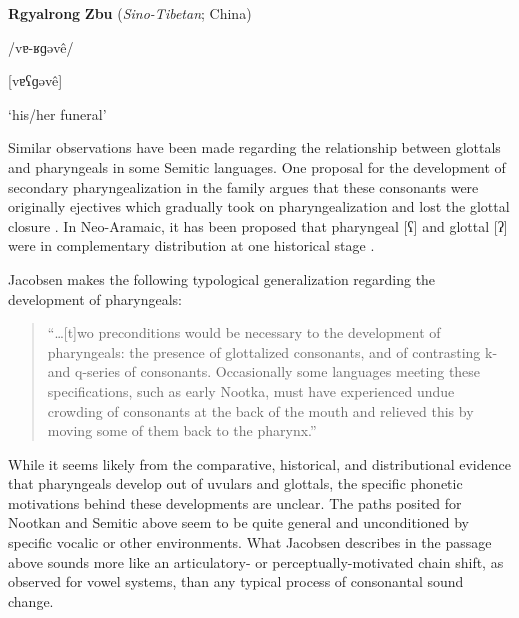 \ea\label{ex:(4.47)}
  \textbf{Rgyalrong} \textbf{Zbu} (\textit{Sino-Tibetan}; China)



/vɐ{}-ʁɡəvê/



[vɐʕɡəvê]



‘his/her funeral’



\citep[62]{Gong2018}

\z


  Similar observations have been made regarding the relationship between glottals and pharyngeals in some Semitic languages. One proposal for the development of secondary pharyngealization in the family argues that these consonants were originally ejectives which gradually took on pharyngealization and lost the glottal closure \citep{Zemánek1996}. In Neo-Aramaic, it has been proposed that pharyngeal [ʕ] and glottal [ʔ] were in complementary distribution at one historical stage \citep{Hoberman1985}.



  Jacobsen makes the following typological generalization regarding the development of pharyngeals:


\begin{quote}
“…[t]wo preconditions would be necessary to the development of pharyngeals: the presence of glottalized consonants, and of contrasting k- and q-series of consonants. Occasionally some languages meeting these specifications, such as early Nootka, must have experienced undue crowding of consonants at the back of the mouth and relieved this by moving some of them back to the pharynx.” 



\citep[152]{Jacobsen1969}
\end{quote}


  While it seems likely from the comparative, historical, and distributional evidence that pharyngeals develop out of uvulars and glottals, the specific phonetic motivations behind these developments are unclear. The paths posited for Nootkan and Semitic above seem to be quite general and unconditioned by specific vocalic or other environments. What Jacobsen describes in the passage above sounds more like an articulatory- or perceptually-motivated chain shift, as observed for vowel systems, than any typical process of consonantal sound change.


\subsection{\rmfamily} 
